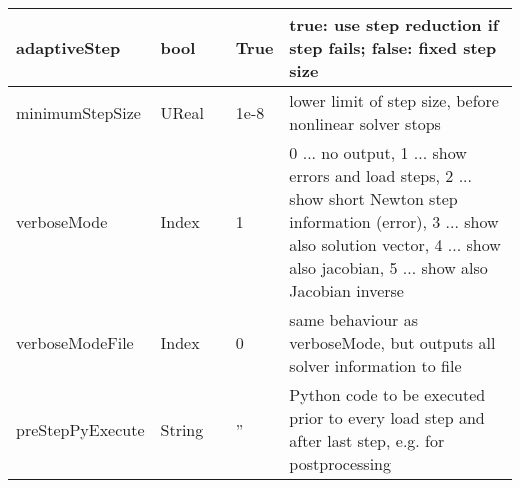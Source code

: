 \begin{center}
\begin{longtable}{| p{4.2cm} | p{2.5cm} | p{0.3cm} | p{3.0cm} | p{6cm} |}
    adaptiveStep &     bool &      &     True &     true: use step reduction if step fails; false: fixed step size\\ \hline
    minimumStepSize &     UReal &      &     1e-8 &     lower limit of step size, before nonlinear solver stops\\ \hline
    verboseMode &     Index &      &     1 &     0 ... no output, 1 ... show errors and load steps, 2 ... show short Newton step information (error), 3 ... show also solution vector, 4 ... show also jacobian, 5 ... show also Jacobian inverse\\ \hline
    verboseModeFile &     Index &      &     0 &     same behaviour as verboseMode, but outputs all solver information to file\\ \hline
    preStepPyExecute &     String &      &     '' &     Python code to be executed prior to every load step and after last step, e.g. for postprocessing\\ \hline
	  \end{longtable}
	\end{center}

